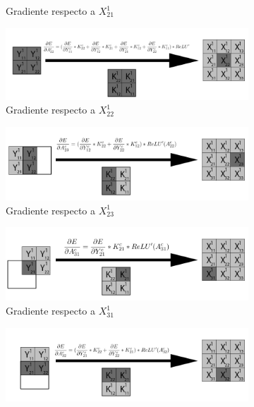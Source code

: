 \begin{figure}[H]
\begin{subfigure}{.5\textwidth}
		\caption{Gradiente respecto a $X^1_{21}$}
	\end{subfigure}
		\vspace{5mm}
	\begin{subfigure}{.5\textwidth}
		\hspace{-25mm}
		\includegraphics[width=1.4\linewidth]{imagenes/conv_back_entrada_5.jpg}  
		\caption{Gradiente respecto a $X^1_{22}$}
	\end{subfigure}%
	\begin{subfigure}{.5\textwidth}
		\hspace{5mm}
		\includegraphics[width=1.4\linewidth]{imagenes/conv_back_entrada_6.jpg}  
		\caption{Gradiente respecto a $X^1_{23}$}
	\end{subfigure}
		\vspace{5mm}
	\begin{subfigure}{.5\textwidth}
		\hspace{-25mm}
		\includegraphics[width=1.4\linewidth]{imagenes/conv_back_entrada_7.jpg}  
		\caption{Gradiente respecto a $X^1_{31}$}
	\end{subfigure}%
	\begin{subfigure}{.5\textwidth}
		\hspace{5mm}
		\includegraphics[width=1.4\linewidth]{imagenes/conv_back_entrada_8.jpg}  

\end{subfigure}
\end{figure}
